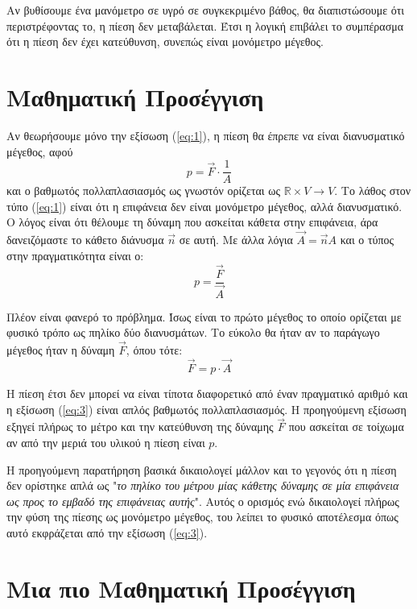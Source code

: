 \documentclass[12pt]{article}
\begin{document}
Αν βυθίσουμε ένα μανόμετρο σε υγρό σε συγκεκριμένο βάθος, θα διαπιστώσουμε ότι περιστρέφοντας το, η πίεση δεν μεταβάλεται. Έτσι η λογική επιβάλει το συμπέρασμα ότι η πίεση δεν έχει κατεύθυνση, συνεπώς είναι μονόμετρο μέγεθος.

\section{Μαθηματική Προσέγγιση}
Αν θεωρήσουμε μόνο την εξίσωση (\ref{eq:1}), η πίεση θα έπρεπε να είναι διανυσματικό μέγεθος, αφού
\begin{equation} \label{eq:4}
  p=\vec{F}\cdot\frac{1}{A}
\end{equation}
και ο βαθμωτός πολλαπλασιασμός ως γνωστόν ορίζεται ως $\mathbb{R} \times V \to V$. Το λάθος στον τύπο (\ref{eq:1}) είναι ότι η επιφάνεια δεν είναι μονόμετρο μέγεθος, αλλά διανυσματικό. Ο λόγος είναι ότι θέλουμε τη δύναμη που ασκείται κάθετα στην επιφάνεια, άρα δανειζόμαστε το κάθετο διάνυσμα $\vec{n}$ σε αυτή. Με άλλα λόγια $\vec{Α}=\vec{n}Α$ και ο τύπος στην πραγματικότητα είναι ο:
\begin{equation} \label{eq:2}
  p=\frac{\vec{F}}{\vec{A}}
\end{equation}

Πλέον είναι φανερό το πρόβλημα. Ίσως είναι το πρώτο μέγεθος το οποίο ορίζεται με φυσικό τρόπο ως πηλίκο δύο διανυσμάτων. Το εύκολο θα ήταν αν το παράγωγο μέγεθος ήταν η δύναμη $\vec{F}$, όπου τότε:
\begin{equation} \label{eq:3}
  \vec{F}=p\cdot \vec{A}
\end{equation}

Η πίεση έτσι δεν μπορεί να είναι τίποτα διαφορετικό από έναν πραγματικό αριθμό και η εξίσωση (\ref{eq:3}) είναι απλός βαθμωτός πολλαπλασιασμός. Η προηγούμενη εξίσωση εξηγεί πλήρως το μέτρο και την κατεύθυνση της δύναμης $\vec{F}$ που ασκείται σε τοίχωμα αν από την μεριά του υλικού η πίεση είναι $p$.

Η προηγούμενη παρατήρηση βασικά δικαιολογεί μάλλον και το γεγονός ότι η πίεση δεν ορίστηκε απλά ως "\textit{το πηλίκο του μέτρου μίας κάθετης δύναμης σε μία επιφάνεια ως προς το εμβαδό της επιφάνειας αυτής}". Αυτός ο ορισμός ενώ δικαιολογεί πλήρως την φύση της πίεσης ως μονόμετρο μέγεθος, του λείπει το φυσικό αποτέλεσμα όπως αυτό εκφράζεται από την εξίσωση (\ref{eq:3}).

\section{Μια πιο Μαθηματική Προσέγγιση}
\end{document}
